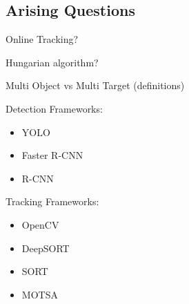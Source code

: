 \subsection{Arising Questions}

Online Tracking?

Hungarian algorithm?

Multi Object vs Multi Target (definitions)

Detection Frameworks:
\begin{itemize}
    \item YOLO
    \item Faster R-CNN
    \item R-CNN
\end{itemize}

Tracking Frameworks:
\begin{itemize}
    \item OpenCV
    \item DeepSORT
    \item SORT
    \item MOTSA
\end{itemize}